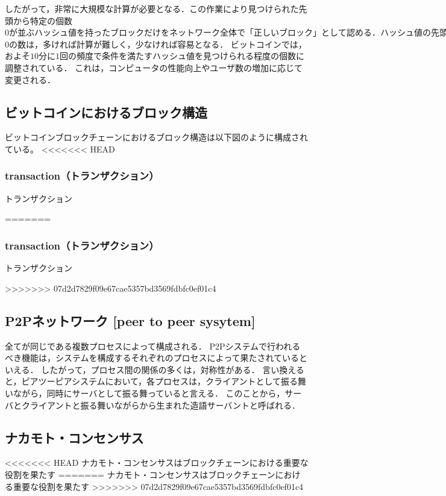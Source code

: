 \documentclass[a4paper,12pt]{jsarticle}
\begin{document}
したがって，非常に大規模な計算が必要となる．この作業により見つけられた先頭から特定の個数$0が並ぶハッシュ値を持ったブロックだけをネットワーク全体で「正しいブロック」として認める．
ハッシュ値の先頭から並ぶ$0の数は，多ければ計算が難しく，少なければ容易となる．
ビットコインでは，およそ$10$分に$1$回の頻度で条件を満たすハッシュ値を見つけられる程度の個数に調整されている．
これは，コンピュータの性能向上やユーザ数の増加に応じて変更される．


      \subsection{ビットコインにおけるブロック構造}
ビットコインブロックチェーンにおけるブロック構造は以下図のように構成されている。
<<<<<<< HEAD


            \subsubsection{transaction（トランザクション）}
トランザクション


=======


            \subsubsection{transaction（トランザクション）}
トランザクション


>>>>>>> 07d2d7829f09e67cae5357bd3569fdbfc0ef01c4
      \subsection{P2Pネットワーク [peer to peer sysytem]}
全てが同じである複数プロセスによって構成される．
P2Pシステムで行われるべき機能は，システムを構成するそれぞれのプロセスによって果たされているといえる．
したがって，プロセス間の関係の多くは，対称性がある．
言い換えると，ピアツーピアシステムにおいて，各プロセスは，クライアントとして振る舞いながら，同時にサーバとして振る舞っていると言える．
このことから，サーバとクライアントと振る舞いながらから生まれた造語サーバントと呼ばれる．

      \subsection{ナカモト・コンセンサス}
<<<<<<< HEAD
ナカモト・コンセンサスはブロックチェーンにおける重要な役割を果たす
=======
      ナカモト・コンセンサスはブロックチェーンにおける重要な役割を果たす
>>>>>>> 07d2d7829f09e67cae5357bd3569fdbfc0ef01c4
\end{document}
